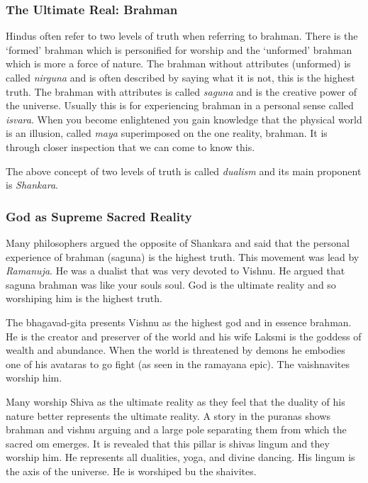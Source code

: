 \documentclass{article}
\begin{document}
\subsubsection*{The Ultimate Real: Brahman}
\label{sub:the_ultimate_real_brahman}
Hindus often refer to two levels of truth when referring to brahman. There is the `formed' brahman which is personified for worship and the `unformed' brahman which is more a force of nature. The brahman without attributes (unformed) is called \emph{nirguna} and is often described by saying what it is not, this is the highest truth. The brahman with attributes is called \emph{saguna} and is the creative power of the universe. Usually this is for experiencing brahman in a personal sense called \emph{isvara}. When you become enlightened you gain knowledge that the physical world is an illusion, called \emph{maya} superimposed on the one reality, brahman. It is through closer inspection that we can come to know this.

The above concept of two levels of truth is called \emph{dualism} and its main proponent is \emph{Shankara}.

\subsubsection*{God as Supreme Sacred Reality}
\label{sub:god_as_supreme_sacred_reality}
Many philosophers argued the opposite of Shankara and said that the personal experience of brahman (saguna) is the highest truth. This movement was lead by \emph{Ramanuja}. He was a dualist that was very devoted to Vishnu. He argued that saguna brahman was like your souls soul. God is the ultimate reality and so worshiping him is the highest truth.

The bhagavad-gita presents Vishnu as the highest god and in essence brahman. He is the creator and preserver of the world and his wife Laksmi is the goddess of wealth and abundance. When the world is threatened by demons he embodies one of his avataras to go fight (as seen in the ramayana epic). The vaishnavites worship him.

Many worship Shiva as the ultimate reality as they feel that the duality of his nature better represents the ultimate reality. A story in the puranas shows brahman and vishnu arguing and a large pole separating them from which the sacred om emerges. It is revealed that this pillar is shivas lingum and they worship him. He represents all dualities, yoga, and divine dancing. His lingum is the axis of the universe. He is worshiped bu the shaivites.
\end{document}
